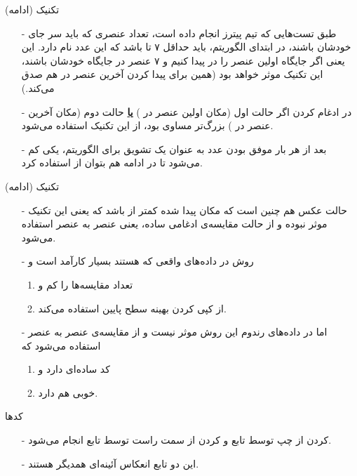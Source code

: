 \begin{frame}{تکنیک  (ادامه)}
\begin{itemize}\itemr
\item[-]
طبق تست‌هایی که تیم پیترز انجام داده است، تعداد عنصری که باید سر جای خودشان باشند، در ابتدای الگوریتم، باید حداقل ۷ تا باشد که این عدد نام  دارد. این یعنی اگر جایگاه اولین عنصر 
را در 
پیدا کنیم و ۷ عنصر در جایگاه خودشان باشند، این تکنیک موثر خواهد بود (همین برای پیدا کردن آخرین عنصر  در  هم صدق می‌کند.)

\item[-]
در ادغام کردن اگر حالت اول (مکان اولین عنصر  در ) \textbf{\underline{یا}} حالت دوم (مکان آخرین عنصر  در ) بزرگ‌تر مساوی  بود، از این تکنیک استفاده می‌شود.

\item[-]
بعد از هر بار موفق بودن  عدد  به عنوان یک تشویق برای الگوریتم، یکی کم می‌شود تا در ادامه هم بتوان از  استفاده کرد.
\end{itemize}
\end{frame}

\begin{frame}{تکنیک  (ادامه)}
\begin{itemize}\itemr
\item[-]
حالت عکس هم چنین است که مکان پیدا شده کمتر از 
باشد که یعنی این تکنیک موثر نبوده و از حالت مقایسه‌ی ادغامی ساده، یعنی عنصر به عنصر استفاده می‌شود.

\item[-]
روش  در داده‌های واقعی که  هستند بسیار کارآمد است و
\begin{enumerate}\itemr
\item
تعداد مقایسه‌ها را کم و
\item
از کپی کردن بهینه سطح پایین استفاده می‌کند.
\end{enumerate}

\item[-]
اما در داده‌های رندوم این روش موثر نیست و از مقایسه‌ی عنصر به عنصر استفاده می‌شود که 
\begin{enumerate}\itemr
\item
کد ساده‌ای دارد و
\item
{}
 خوبی هم دارد.
\end{enumerate}
\end{itemize}
\end{frame}

\begin{frame}{کدها}
\begin{itemize}\itemr
\item[-]
کردن از چپ توسط تابع
و 
کردن از سمت راست توسط تابع
انجام می‌شود.

\item[-]
این دو تابع انعکاس آئینه‌ای همدیگر هستند.
\end{itemize}
\end{frame}